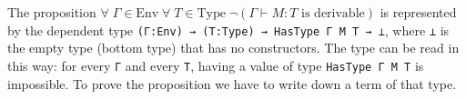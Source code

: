 \documentclass{article}
\begin{document}
The proposition $\forall \; \Gamma \in \text{Env} \; \forall \; T \in \text{Type} \; \neg (\Gamma \vdash M : T \text{ is derivable})$ is represented by the dependent type \texttt{(Γ:Env) → (T:Type) → HasType Γ M T → ⊥}, where \texttt{⊥} is the empty type (bottom type) that has no constructors.
The type can be read in this way: for every \texttt{Γ} and every \texttt{T}, having a value of type \texttt{HasType Γ M T} is impossible.
To prove the proposition we have to write down a term of that type.




\newpage
\nocite{*}
\printbibliography
\end{document}

